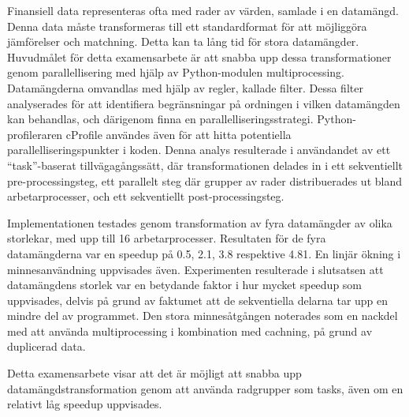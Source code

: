 Finansiell data representeras ofta med rader av värden, samlade i en datamängd. Denna data måste transformeras
till ett standardformat för att möjliggöra jämförelser och matchning. Detta kan ta lång tid för stora
datamängder. Huvudmålet för detta examensarbete är att snabba upp dessa transformationer genom parallellisering
med hjälp av Python-modulen multiprocessing. Datamängderna omvandlas med hjälp av regler, kallade filter.
Dessa filter analyserades för att identifiera begränsningar på ordningen i vilken datamängden kan behandlas,
och därigenom finna en parallelliseringsstrategi. Python-profileraren cProfile användes även för att hitta
potentiella parallelliseringspunkter i koden. Denna analys resulterade i användandet av ett ``task''-baserat
tillvägagångssätt, där transformationen delades in i ett sekventiellt pre-processingsteg, ett parallelt steg 
där grupper av rader distribuerades ut bland arbetarprocesser, och ett sekventiellt post-processingsteg.

Implementationen testades genom transformation av fyra datamängder av olika storlekar, med upp till 16 
arbetarprocesser. Resultaten för de fyra datamängderna var en speedup på 0.5, 2.1, 3.8 respektive 4.81.
En linjär ökning i minnesanvändning uppvisades även. Experimenten resulterade i slutsatsen att
datamängdens storlek var en betydande faktor i hur mycket speedup som uppvisades, delvis på grund av faktumet
att de sekventiella delarna tar upp en mindre del av programmet. Den stora minnesåtgången noterades som
en nackdel med att använda multiprocessing i kombination med cachning, på grund av duplicerad data.

Detta examensarbete visar att det är möjligt att snabba upp datamängdstransformation genom att använda
radgrupper som tasks, även om en relativt låg speedup uppvisades.
